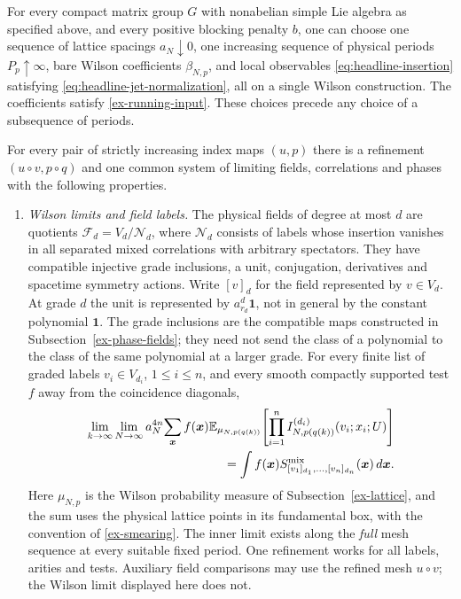 \begin{theorem}
\label{thm:ex-construction-headline}
For every compact matrix group $G$ with nonabelian simple Lie algebra as
specified above, and every positive blocking penalty $b$, one can choose
one sequence of lattice spacings $a_N\downarrow0$, one increasing sequence
of physical periods $P_p\uparrow\infty$, bare Wilson coefficients
$\beta_{N,p}$, and local observables \eqref{eq:headline-insertion} satisfying
\eqref{eq:headline-jet-normalization}, all on a single Wilson construction.
The coefficients satisfy \eqref{ex-running-input}. These choices precede
any choice of a subsequence of periods.

For every pair of strictly increasing index maps $(u,p)$ there is a
refinement $(u\circ v,p\circ q)$ and one common system of limiting fields,
correlations and phases with the following properties.
\begin{enumerate}
\item \emph{Wilson limits and field labels.}
The physical fields of degree at most $d$ are quotients
$\mathcal F_d=V_d/\mathcal N_d$, where $\mathcal N_d$ consists of labels
whose insertion vanishes in all separated mixed correlations with arbitrary
spectators. They have compatible injective grade inclusions, a unit,
conjugation, derivatives and spacetime symmetry actions. Write $[v]_d$ for
the field represented by $v\in V_d$. At grade $d$ the unit is represented
by $a_{r_d}^{d}\mathbf1$, not in general by the constant polynomial
$\mathbf1$. The grade inclusions are the compatible maps constructed in
Subsection~\ref{ex-phase-fields}; they need not send the class of a polynomial
to the class of the same polynomial at a larger grade. For every finite
list of graded labels $v_i\in V_{d_i}$, $1\le i\le n$, and
every smooth compactly supported test $f$ away from the coincidence diagonals,
\begin{equation}\label{eq:headline-wilson-limit}
\begin{split}
 \lim_{k\to\infty}\lim_{N\to\infty}
 a_N^{4n}\!\sum_{\boldsymbol x} f(\boldsymbol x)
 \mathbb E_{\mu_{N,p(q(k))}}
 \!\left[\prod_{i=1}^n I^{(d_i)}_{N,p(q(k))}(v_i;x_i;U)\right]\\
 =\int f(\boldsymbol x)S^{\rm mix}_{[v_1]_{d_1},\ldots,[v_n]_{d_n}}
                     (\boldsymbol x)\,d\boldsymbol x .
\end{split}
\end{equation}
Here $\mu_{N,p}$ is the Wilson probability measure of
Subsection~\ref{ex-lattice}, and the sum uses the physical lattice points in
its fundamental box, with the convention of \eqref{ex-smearing}.
The inner limit exists along the \emph{full} mesh sequence at every
suitable fixed period. One refinement works for all labels, arities and
tests. Auxiliary field comparisons may use the refined mesh $u\circ v$;
the Wilson limit displayed here does not.


\end{enumerate}
\end{theorem}
